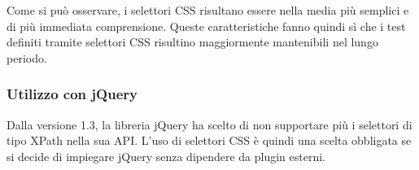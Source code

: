 Come si può osservare, i selettori CSS risultano essere nella media più semplici e di più immediata comprensione. Queste caratteristiche fanno quindi sì che i test definiti tramite selettori CSS risultino maggiormente mantenibili nel lungo periodo.

\subsubsection{Utilizzo con jQuery}

Dalla versione 1.3, la libreria jQuery ha scelto di non supportare più i selettori di tipo XPath nella sua API. L'uso di selettori CSS è quindi una scelta obbligata se si decide di impiegare jQuery senza dipendere da plugin esterni.